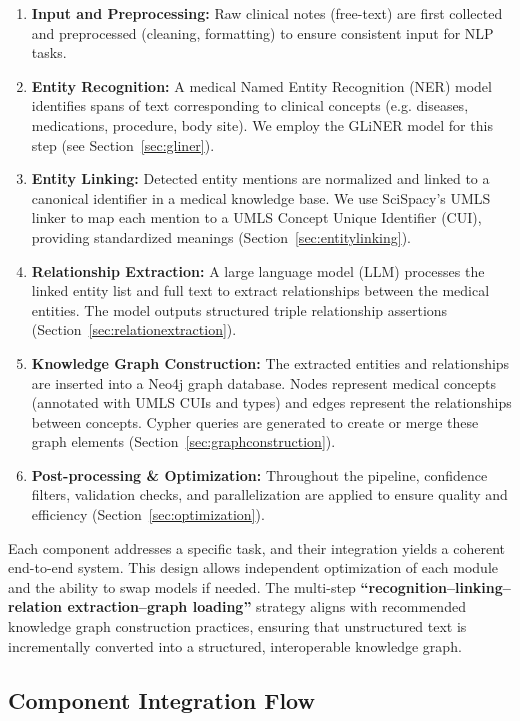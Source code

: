 \begin{enumerate}
\item \textbf{Input and Preprocessing:} Raw clinical notes (free-text) are first collected and preprocessed (cleaning, formatting) to ensure consistent input for NLP tasks.
\item \textbf{Entity Recognition:} A medical Named Entity Recognition (NER) model identifies spans of text corresponding to clinical concepts (e.g. diseases, medications, procedure, body site). We employ the GLiNER model for this step (see Section~\ref{sec:gliner}).
\item \textbf{Entity Linking:} Detected entity mentions are normalized and linked to a canonical identifier in a medical knowledge base. We use SciSpacy's UMLS linker to map each mention to a UMLS Concept Unique Identifier (CUI), providing standardized meanings (Section~\ref{sec:entitylinking}).
\item \textbf{Relationship Extraction:} A large language model (LLM) processes the linked entity list and full text to extract relationships between the medical entities. The model outputs structured triple relationship assertions (Section~\ref{sec:relationextraction}).
\item \textbf{Knowledge Graph Construction:} The extracted entities and relationships are inserted into a Neo4j graph database. Nodes represent medical concepts (annotated with UMLS CUIs and types) and edges represent the relationships between concepts. Cypher queries are generated to create or merge these graph elements (Section~\ref{sec:graphconstruction}).
\item \textbf{Post-processing \& Optimization:} Throughout the pipeline, confidence filters, validation checks, and parallelization are applied to ensure quality and efficiency (Section~\ref{sec:optimization}).
\end{enumerate}

Each component addresses a specific task, and their integration yields a coherent end-to-end system. This design allows independent optimization of each module and the ability to swap models if needed. The multi-step \textbf{``recognition–linking–relation extraction–graph loading''} strategy aligns with recommended knowledge graph construction practices, ensuring that unstructured text is incrementally converted into a structured, interoperable knowledge graph.

\subsection{Component Integration Flow}

